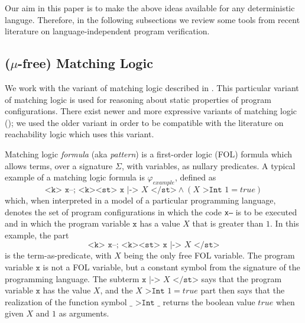Our aim in this paper is to make the above ideas available for any deterministic languge.
Therefore, in the following subsections we review some tools from recent literature
on language-independent program verification.

\subsection{($\mu$-free) Matching Logic}
We work with the variant of matching logic described in
\cite{StefanescuCMMSR19,RosuSCM13lics}.
This particular variant of matching logic is used for reasoning about static properties of program configurations.
There exist newer and more expressive variants of matching logic (\cite{MmL, MLexplained});
we used the older variant in order to be compatible with the literature on reachability logic which uses this variant.

Matching logic \emph{formula} (aka \emph{pattern}) is a first-order logic (FOL) formula which allows terms,
over a signature $\Sigma$, with variables, as nullary predicates.
A typical example of a matching logic formula is $\varphi_{\mathit{example}}$, defined as
\begin{equation}\label{eqn:exampleMLPattern}
\texttt{<k> x--; <k><st> x} \texttt{ |-> } X\texttt{ </st>} \land (X \texttt{ >Int } 1 = \mathit{true})
\end{equation}
which, when interpreted in a model of a particular programming language,
denotes the set of program configurations in which the code \texttt{x--} is to be executed
and in which the program variable $\texttt{x}$ has a value $X$ that is greater than $1$.
In this example, the part
\begin{equation*}
    \texttt{<k> x--; <k><st> x} \texttt{ |-> } X\texttt{ </st>}
\end{equation*}
is the term-as-predicate, with $X$ being the only free FOL variable.
The program variable $\texttt{x}$ is not a FOL variable, but a constant symbol from the signature of the programming language.
The subterm $\texttt{x} \texttt{ |-> } X\texttt{ </st>}$ says that the program variable $\texttt{x}$
has the value $X$, and the $X \texttt{ >Int } 1 = \mathit{true}$ part then says that the realization
of the function symbol $\_ \texttt{ >Int } \_$ returns the boolean value $\mathit{true}$ when given $X$ and $1$
as arguments.

